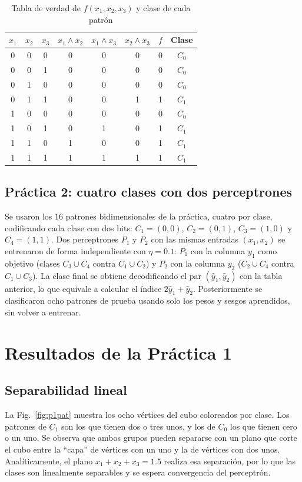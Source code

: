\documentclass[conference]{IEEEtran}
\begin{document}
\begin{table}[htbp]
\caption{Tabla de verdad de $f(x_1,x_2,x_3)$ y clase de cada patrón}
\label{tab:verdad}
\begin{center}
\begin{tabular}{cccccccc}
\toprule
$x_1$ & $x_2$ & $x_3$ & $x_1\wedge x_2$ & $x_1\wedge x_3$ & $x_2\wedge x_3$ & $f$ & Clase \\
\midrule
0 & 0 & 0 & 0 & 0 & 0 & 0 & $C_0$ \\
0 & 0 & 1 & 0 & 0 & 0 & 0 & $C_0$ \\
0 & 1 & 0 & 0 & 0 & 0 & 0 & $C_0$ \\
0 & 1 & 1 & 0 & 0 & 1 & 1 & $C_1$ \\
1 & 0 & 0 & 0 & 0 & 0 & 0 & $C_0$ \\
1 & 0 & 1 & 0 & 1 & 0 & 1 & $C_1$ \\
1 & 1 & 0 & 1 & 0 & 0 & 1 & $C_1$ \\
1 & 1 & 1 & 1 & 1 & 1 & 1 & $C_1$ \\
\bottomrule
\end{tabular}
\end{center}
\end{table}

\subsection{Práctica 2: cuatro clases con dos perceptrones}
Se usaron los $16$ patrones bidimensionales de la práctica, cuatro por clase,
codificando cada clase con dos bits: $C_1=(0,0)$, $C_2=(0,1)$, $C_3=(1,0)$ y
$C_4=(1,1)$. Dos perceptrones $P_1$ y $P_2$ con las mismas entradas
$(x_1,x_2)$ se entrenaron de forma independiente con $\eta=0.1$: $P_1$ con
la columna $y_1$ como objetivo (clases $C_3\cup C_4$ contra $C_1\cup C_2$) y
$P_2$ con la columna $y_2$ ($C_2\cup C_4$ contra $C_1\cup C_3$). La clase
final se obtiene decodificando el par $(\hat y_1,\hat y_2)$ con la tabla
anterior, lo que equivale a calcular el índice $2\hat y_1+\hat y_2$.
Posteriormente se clasificaron ocho patrones de prueba usando solo los pesos
y sesgos aprendidos, sin volver a entrenar.

\section{Resultados de la Práctica 1}

\subsection{Separabilidad lineal}
La Fig.~\ref{fig:p1pat} muestra los ocho vértices del cubo coloreados por
clase. Los patrones de $C_1$ son los que tienen dos o tres unos, y los de
$C_0$ los que tienen cero o un uno. Se observa que ambos grupos pueden
separarse con un plano que corte el cubo entre la ``capa'' de vértices con un
uno y la de vértices con dos unos. Analíticamente, el plano
$x_1+x_2+x_3=1.5$ realiza esa separación, por lo que las clases son
linealmente separables y se espera convergencia del perceptrón.
\end{document}
